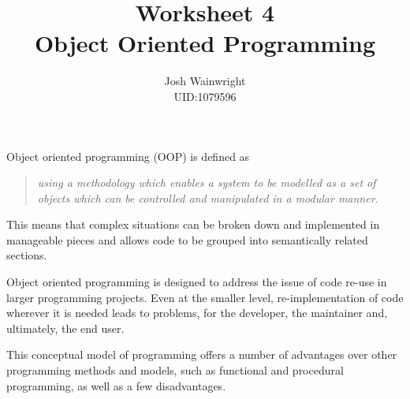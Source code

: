 \documentclass[11pt]{article} %
\author{Josh Wainwright \\ UID:1079596}
\title{Worksheet 4 \\ Object Oriented Programming}
\date{}
\begin{document}
\maketitle

Object oriented programming (OOP) is defined as

\begin{quote}
	\textit{using a methodology which enables a system to be modelled as a set
	of objects which can be controlled and manipulated in a modular
	manner.}\cite{oed}
\end{quote}

This means that complex situations can be broken down and implemented in
manageable pieces and allows code to be grouped into semantically related
sections.

Object oriented programming is designed to address the issue of code re-use in
larger programming projects. Even at the smaller level, re-implementation of
code wherever it is needed leads to problems, for the developer, the maintainer
and, ultimately, the end user.

This conceptual model of programming offers a number of advantages over other
programming methods and models, such as functional and procedural programming,
as well as a few disadvantages.
\end{document}
